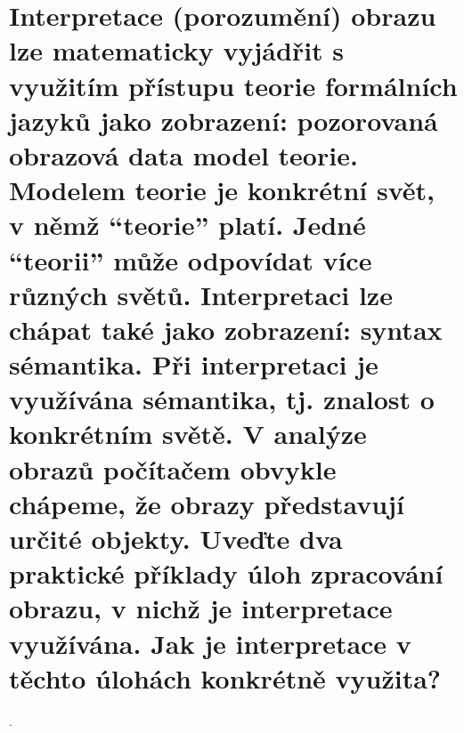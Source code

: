 \section{Interpretace (porozumění) obrazu lze matematicky vyjádřit s využitím přístupu teorie formálních jazyků jako 
zobrazení: pozorovaná obrazová data \texorpdfstring{\rightarrow}{→} model teorie. Modelem teorie je konkrétní svět, v němž \enquote{teorie} 
platí. Jedné \enquote{teorii} může odpovídat více různých světů. Interpretaci lze chápat také jako zobrazení: syntax 
\texorpdfstring{\rightarrow}{→} sémantika. Při interpretaci je využívána sémantika, tj. znalost o konkrétním světě. V analýze obrazů 
počítačem obvykle chápeme, že obrazy představují určité objekty. Uveďte dva praktické příklady úloh zpracování obrazu, 
v nichž je interpretace využívána. Jak je interpretace v těchto úlohách konkrétně využita?}.